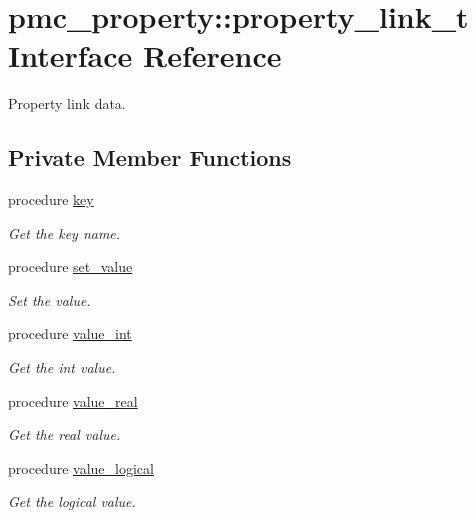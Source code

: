 \hypertarget{structpmc__property_1_1property__link__t}{}\section{pmc\+\_\+property\+:\+:property\+\_\+link\+\_\+t Interface Reference}
\label{structpmc__property_1_1property__link__t}


Property link data.  


\subsection*{Private Member Functions}
\begin{DoxyCompactItemize}
\item 
procedure \mbox{\hyperlink{structpmc__property_1_1property__link__t_a0c80b3d389d2619ddba7c05a924f7200}{key}}
\begin{DoxyCompactList}\small\item\em Get the key name. \end{DoxyCompactList}\item 
procedure \mbox{\hyperlink{structpmc__property_1_1property__link__t_af1fda3847e4a911454e6a94e910b2dcc}{set\+\_\+value}}
\begin{DoxyCompactList}\small\item\em Set the value. \end{DoxyCompactList}\item 
procedure \mbox{\hyperlink{structpmc__property_1_1property__link__t_a79b0e9d9be75b18380aa2c888eaf4217}{value\+\_\+int}}
\begin{DoxyCompactList}\small\item\em Get the int value. \end{DoxyCompactList}\item 
procedure \mbox{\hyperlink{structpmc__property_1_1property__link__t_aa73c3f8f6c513212bcfa79cc49d05539}{value\+\_\+real}}
\begin{DoxyCompactList}\small\item\em Get the real value. \end{DoxyCompactList}\item 
procedure \mbox{\hyperlink{structpmc__property_1_1property__link__t_ad4b9e4a004d5cc199d3cc42518c85ad0}{value\+\_\+logical}}
\begin{DoxyCompactList}\small\item\em Get the logical value. \end{DoxyCompactList}\item 

\end{DoxyCompactItemize}
